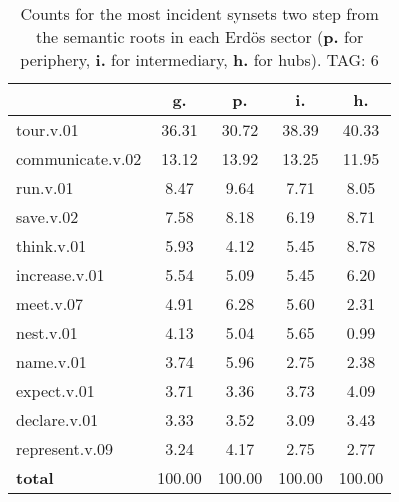 \begin{table}[h!]
\begin{center}
\begin{tabular}{| l | c | c | c | c |}\hline
 & g. & p. & i. & h. \\\hline
tour.v.01 & 36.31  & 30.72  & 38.39  & 40.33 \\\hline
communicate.v.02 & 13.12  & 13.92  & 13.25  & 11.95 \\\hline
run.v.01 & 8.47  & 9.64  & 7.71  & 8.05 \\\hline
save.v.02 & 7.58  & 8.18  & 6.19  & 8.71 \\\hline
think.v.01 & 5.93  & 4.12  & 5.45  & 8.78 \\\hline
increase.v.01 & 5.54  & 5.09  & 5.45  & 6.20 \\\hline
meet.v.07 & 4.91  & 6.28  & 5.60  & 2.31 \\\hline
nest.v.01 & 4.13  & 5.04  & 5.65  & 0.99 \\\hline
name.v.01 & 3.74  & 5.96  & 2.75  & 2.38 \\\hline
expect.v.01 & 3.71  & 3.36  & 3.73  & 4.09 \\\hline
declare.v.01 & 3.33  & 3.52  & 3.09  & 3.43 \\\hline
represent.v.09 & 3.24  & 4.17  & 2.75  & 2.77 \\\hline
{{\bf total}} & 100.00  & 100.00  & 100.00  & 100.00 \\\hline
\end{tabular}
\caption{Counts for the most incident synsets two step from the semantic roots in each Erd\"os sector ({\bf p.} for periphery, {\bf i.} for intermediary, {\bf h.} for hubs). TAG: 6}
\end{center}
\end{table}